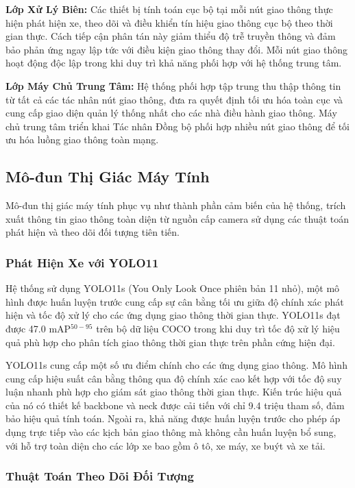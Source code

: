 \textbf{Lớp Xử Lý Biên:} Các thiết bị tính toán cục bộ tại mỗi nút giao thông thực hiện phát hiện xe, 
theo dõi và điều khiển tín hiệu giao thông cục bộ theo thời gian thực. Cách tiếp cận phân tán này 
giảm thiểu độ trễ truyền thông và đảm bảo phản ứng ngay lập tức với điều kiện giao thông thay đổi. 
Mỗi nút giao thông hoạt động độc lập trong khi duy trì khả năng phối hợp với hệ thống trung tâm.

\textbf{Lớp Máy Chủ Trung Tâm:} Hệ thống phối hợp tập trung thu thập thông tin từ tất cả các tác nhân 
nút giao thông, đưa ra quyết định tối ưu hóa toàn cục và cung cấp giao diện quản lý thống nhất 
cho các nhà điều hành giao thông. Máy chủ trung tâm triển khai Tác nhân Đồng bộ phối hợp nhiều 
nút giao thông để tối ưu hóa luồng giao thông toàn mạng.

\subsection{Mô-đun Thị Giác Máy Tính}\label{subsec2a-2}

Mô-đun thị giác máy tính phục vụ như thành phần cảm biến của hệ thống, trích xuất thông tin 
giao thông toàn diện từ nguồn cấp camera sử dụng các thuật toán phát hiện và theo dõi đối tượng tiên tiến.

\subsubsection{Phát Hiện Xe với YOLO11}

Hệ thống sử dụng YOLO11s (You Only Look Once phiên bản 11 nhỏ), một mô hình được huấn luyện trước 
cung cấp sự cân bằng tối ưu giữa độ chính xác phát hiện và tốc độ xử lý cho các ứng dụng giao thông 
thời gian thực. YOLO11s đạt được 47.0 mAP$^{50-95}$ trên bộ dữ liệu COCO trong khi duy trì tốc độ 
xử lý hiệu quả phù hợp cho phân tích giao thông thời gian thực trên phần cứng hiện đại.

YOLO11s cung cấp một số ưu điểm chính cho các ứng dụng giao thông. Mô hình cung cấp hiệu suất cân bằng 
thông qua độ chính xác cao kết hợp với tốc độ suy luận nhanh phù hợp cho giám sát giao thông thời gian thực. 
Kiến trúc hiệu quả của nó có thiết kế backbone và neck được cải tiến với chỉ 9.4 triệu tham số, 
đảm bảo hiệu quả tính toán. Ngoài ra, khả năng được huấn luyện trước cho phép áp dụng trực tiếp 
vào các kịch bản giao thông mà không cần huấn luyện bổ sung, với hỗ trợ toàn diện cho các lớp xe 
bao gồm ô tô, xe máy, xe buýt và xe tải.

\subsubsection{Thuật Toán Theo Dõi Đối Tượng}

